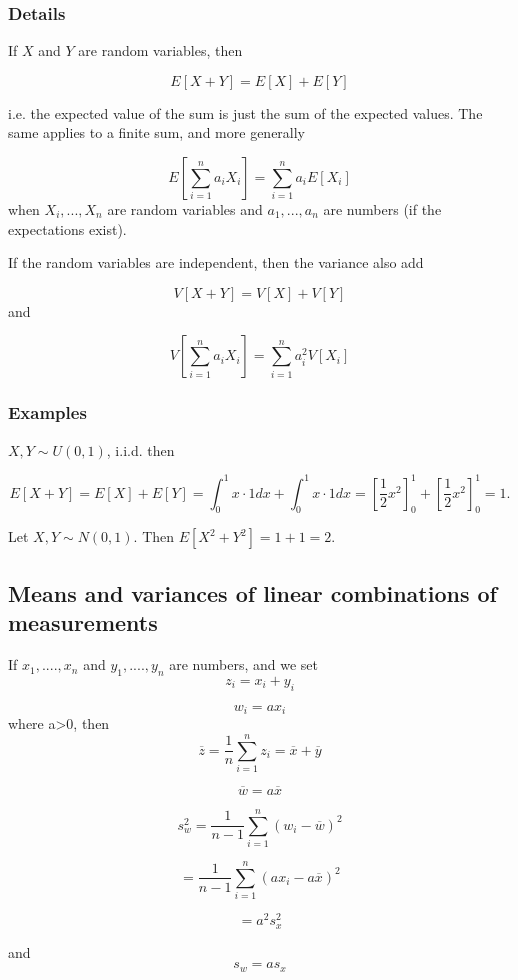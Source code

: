 \documentclass[12pt,a4paper]{article}
\theoremstyle{regla}
\theoremstyle{remark}
\theoremstyle{definition}
\theoremstyle{nonumberbreak}
\begin{document}
\subsubsection{Details}
If $X$ and $Y$ are random variables, then

$$
E[X+Y] = E[X]+E[Y]
$$

i.e. the expected value of the sum is just the sum of the expected values. The same applies to a finite sum, and more generally

$$
E[\sum_{i=1}^{n} a_i X_i] = \sum_{i=1}^{n} a_i E[X_i] 
$$
when $X_i,...,X_n$ are random variables and $a_1,...,a_n$ are numbers (if the expectations exist).

If the random variables are independent, then the variance also add

$$
V[X+Y] = V[X] + V[Y]
$$
and

$$
V[\sum_{i=1}^{n} a_i X_i] = \sum_{i=1}^{n} a_i^2 V[X_i]
$$
\subsubsection{Examples}
\begin{xmpl}
$X,Y \sim U(0,1)$, i.i.d. then

$$
E[X+Y]=E[X] + E[Y] = \int_0^1 x\cdot 1dx+\int_0^1 x\cdot 1dx = [\frac{1}{2}x^2]_0^1+[\frac{1}{2}x^2]_0^1=1.
$$
\end{xmpl}
\begin{xmpl}


Let $X,Y\sim N(0,1)$. Then $E[X^2+Y^2] = 1+1=2$.
\end{xmpl}

\subsection{Means and variances of linear combinations of measurements}
\begin{fbox}
\begin{minipage}{0.97\textwidth}
If $x_1,....,x_n$ and $y_1,....,y_n$ are numbers, and we set $$ z_i=x_i + y_i $$

$$w_i=ax_i$$ where a>0, then
$$\overline{z} = \frac{1}{n} \sum_{i=1}^{n} z_i= \overline{x} + \overline{y}$$

$$\overline{w}= a\overline{x}$$

$$s_w^2=\frac{1}{n-1}\sum_{i=1}^{n}(w_i-\overline{w})^2$$

$$ = \frac{1}{n-1}\sum_{i=1}^{n}(ax_i-a\overline{x})^2$$

$$ = a^2s_x^2 $$

and $$s_w=as_x$$

\end{minipage}
\end{fbox}
\end{document}
